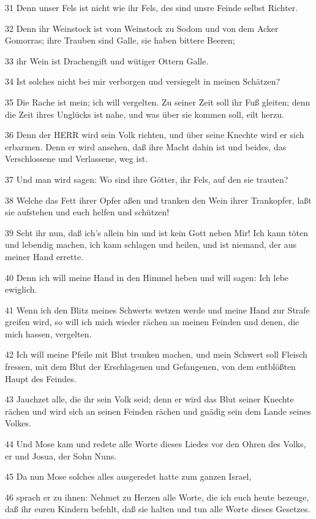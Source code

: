 \par 31 Denn unser Fels ist nicht wie ihr Fels, des sind unsre Feinde selbst Richter.
\par 32 Denn ihr Weinstock ist vom Weinstock zu Sodom und von dem Acker Gomorras; ihre Trauben sind Galle, sie haben bittere Beeren;
\par 33 ihr Wein ist Drachengift und wütiger Ottern Galle.
\par 34 Ist solches nicht bei mir verborgen und versiegelt in meinen Schätzen?
\par 35 Die Rache ist mein; ich will vergelten. Zu seiner Zeit soll ihr Fuß gleiten; denn die Zeit ihres Unglücks ist nahe, und was über sie kommen soll, eilt herzu.
\par 36 Denn der HERR wird sein Volk richten, und über seine Knechte wird er sich erbarmen. Denn er wird ansehen, daß ihre Macht dahin ist und beides, das Verschlossene und Verlassene, weg ist.
\par 37 Und man wird sagen: Wo sind ihre Götter, ihr Fels, auf den sie trauten?
\par 38 Welche das Fett ihrer Opfer aßen und tranken den Wein ihrer Trankopfer, laßt sie aufstehen und euch helfen und schützen!
\par 39 Seht ihr nun, daß ich's allein bin und ist kein Gott neben Mir! Ich kann töten und lebendig machen, ich kann schlagen und heilen, und ist niemand, der aus meiner Hand errette.
\par 40 Denn ich will meine Hand in den Himmel heben und will sagen: Ich lebe ewiglich.
\par 41 Wenn ich den Blitz meines Schwerts wetzen werde und meine Hand zur Strafe greifen wird, so will ich mich wieder rächen an meinen Feinden und denen, die mich hassen, vergelten.
\par 42 Ich will meine Pfeile mit Blut trunken machen, und mein Schwert soll Fleisch fressen, mit dem Blut der Erschlagenen und Gefangenen, von dem entblößten Haupt des Feindes.
\par 43 Jauchzet alle, die ihr sein Volk seid; denn er wird das Blut seiner Knechte rächen und wird sich an seinen Feinden rächen und gnädig sein dem Lande seines Volkes.
\par 44 Und Mose kam und redete alle Worte dieses Liedes vor den Ohren des Volks, er und Josua, der Sohn Nuns.
\par 45 Da nun Mose solches alles ausgeredet hatte zum ganzen Israel,
\par 46 sprach er zu ihnen: Nehmet zu Herzen alle Worte, die ich euch heute bezeuge, daß ihr euren Kindern befehlt, daß sie halten und tun alle Worte dieses Gesetzes.

